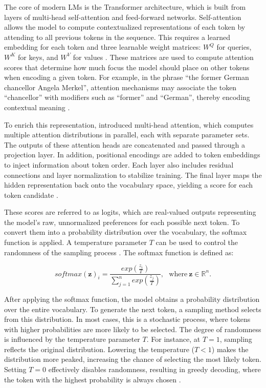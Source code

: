 \documentclass[a4paper,oneside,bibliography=totoc]{scrbook}
\begin{document}
The core of modern \acp{LM} is the Transformer architecture, which is built from layers of multi-head self-attention and feed-forward networks. Self-attention allows the model to compute contextualized representations of each token by attending to all previous tokens in the sequence. This requires a learned embedding for each token and three learnable weight matrices: $W^Q$ for queries, $W^K$ for keys, and $W^V$ for values \cite{Vaswani2023}. These matrices are used to compute attention scores that determine how much focus the model should place on other tokens when encoding a given token. For example, in the phrase \enquote{the former German chancellor Angela Merkel}, attention mechanisms may associate the token \enquote{chancellor} with modifiers such as \enquote{former} and \enquote{German}, thereby encoding contextual meaning \cite{Sanderson2024}.

To enrich this representation, \citet{Vaswani2023} introduced multi-head attention, which computes multiple attention distributions in parallel, each with separate parameter sets. The outputs of these attention heads are concatenated and passed through a projection layer. In addition, positional encodings are added to token embeddings to inject information about token order. Each layer also includes residual connections and layer normalization to stabilize training. The final layer maps the hidden representation back onto the vocabulary space, yielding a score for each token candidate \cite{Vaswani2023}.

These scores are referred to as logits, which are real-valued outputs representing the model’s raw, unnormalized preferences for each possible next token. To convert them into a probability distribution over the vocabulary, the softmax function is applied. A temperature parameter $T$ can be used to control the randomness of the sampling process \cite{Peeperkorn2024}. The softmax function is defined as:

\begin{equation}
  softmax(\mathbf{z})_i = \frac{exp(\frac{z_i}{T})}{\sum_{j=1}^{n} exp(\frac{z_j}{T})},~~~\text{where}~\mathbf{z} \in \mathbb{R}^n.
\end{equation}

After applying the softmax function, the model obtains a probability distribution over the entire vocabulary. To generate the next token, a sampling method selects from this distribution. In most cases, this is a stochastic process, where tokens with higher probabilities are more likely to be selected. The degree of randomness is influenced by the temperature parameter $T$. For instance, at $T = 1$, sampling reflects the original distribution. Lowering the temperature ($T < 1$) makes the distribution more peaked, increasing the chance of selecting the most likely token. Setting $T = 0$ effectively disables randomness, resulting in greedy decoding, where the token with the highest probability is always chosen \cite{Peeperkorn2024}.
\end{document}
